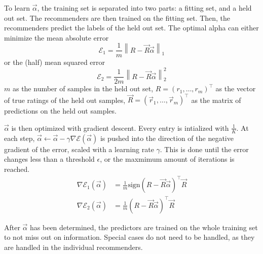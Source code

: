\documentclass[11pt]{scrartcl}
\newcommand{\norm}[1]{\left\| #1 \right\|}
\def\T{\top}
\begin{document}
To learn $\vec{\alpha}$, the training set is separated into two parts: a fitting set, and a held out set.
The recommenders are then trained on the fitting set.
Then, the recommenders predict the labels of the held out set.
The optimal alpha can either minimize the mean absolute error
$$\mathcal{E}_1 = \frac{1}{m}\norm{R - \vec{R} \vec{\alpha}}_1$$
or the (half) mean squared error
$$\mathcal{E}_2 = \frac{1}{2m}\norm{R - \vec{R} \vec{\alpha}}^2_2$$
$m$ as the number of samples in the held out set,
$R = (r_1, \dots, r_m)^\T$ as the vector of true ratings of the held out samples,
$\vec{R} = (\vec{r}_1, \dots, \vec{r}_m)^\T$ as the matrix of predictions on the held out samples.

$\vec{\alpha}$ is then optimized with gradient descent. Every entry is intialized with $\frac{1}{K}$.
At each step, $\vec{\alpha} \gets \vec{\alpha} - \gamma \nabla\mathcal{E}(\vec{\alpha})$ is pushed into the direction of the negative gradient of the error, scaled with a learning rate $\gamma$.
This is done until the error changes less than a threshold $\epsilon$, or the maxmimum amount of iterations is reached.
\begin{align*}
	\nabla\mathcal{E}_1(\vec{\alpha}) & = \frac{1}{m} \text{sign}\left(R - \vec{R} \vec{\alpha}\right)^\T \vec{R} \\
	\nabla\mathcal{E}_2(\vec{\alpha}) & = \frac{1}{m} \left(R - \vec{R} \vec{\alpha}\right)^\T \vec{R}
\end{align*}

After $\vec{\alpha}$ has been determined, the predictors are trained on the whole training set to not miss out on information.
Special cases do not need to be handled, as they are handled in the individual recommenders.

\clearpage
\end{document}
